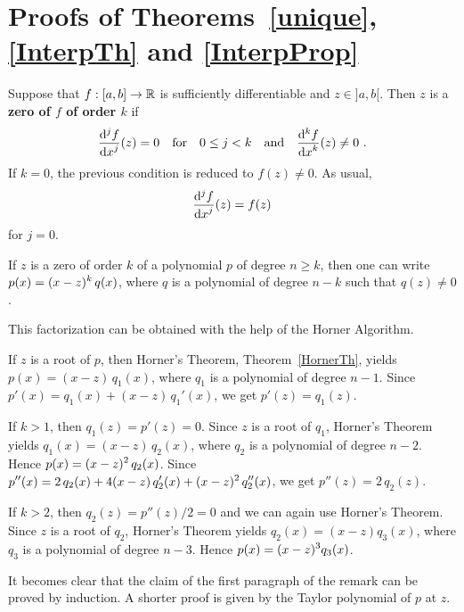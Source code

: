 \section{Proofs of Theorems~\ref{unique}, \ref{InterpTh} and
\ref{InterpProp}} \label{approx_proofs}

\begin{defn}
Suppose that $f:[a,b]\rightarrow \mathbb{R}$ is sufficiently differentiable
and $z\in ]a,b[$.  Then $z$ is a
{\bfseries zero of $f$ of order $k$} if
\[
\displaystyle \frac{\mathrm{d}^{j}{f}} {\displaystyle \mathrm{d}{x}^{j}}(z) = 0 \quad \text{for} \quad 0\leq j < k \quad
\text{and} \quad \displaystyle \frac{\mathrm{d}^{k}{f}} {\displaystyle \mathrm{d}{x}^{k}}(z) \neq 0 \ .
\]
If $k=0$, the previous condition is reduced to $f(z)\neq 0$.  As
usual,
\[
\displaystyle \frac{\mathrm{d}^{j}{f}} {\displaystyle \mathrm{d}{x}^{j}}(z) = f(z)
\]
for $j=0$.
\end{defn}

\begin{lemma} \label{FactPolyRoot}
If $z$ is a zero of order $k$ of a polynomial $p$ of degree
$n\geq k$, then one can write $\displaystyle p(x) = (x-z)^k\,q(x)$,
where $q$ is a polynomial of degree $n-k$ such that $q(z)\neq 0$.
\end{lemma}

This factorization can be obtained with the help of the Horner Algorithm.

If $z$ is a root of $p$, then Horner's Theorem,
Theorem~\ref{HornerTh}, yields $p(x) = (x-z)\,q_1(x)$, where $q_1$ is
a polynomial of degree $n-1$. Since $p'(x) = q_1(x) + (x-z)\,q_1'(x)$,
we get $p'(z) = q_1(z)$.

If $k>1$, then $q_1(z) = p'(z) =0$.  Since $z$ is a root of
$q_1$, Horner's Theorem yields $q_1(x) = (x-z)\,q_2(x)$, where $q_2$ is
a polynomial of degree $n-2$.  Hence
$\displaystyle p(x) = (x-z)^2\,q_2(x)$.  Since
$\displaystyle p''(x) = 2\,q_2(x) + 4(x-z)\,q_2'(x) + (x-z)^2\, q_2''(x)$,
we get $p''(z) = 2 \,q_2(z)$.

If $k>2$, then $q_2(z) = p''(z)/2 = 0$ and we can again use Horner's
Theorem.  Since $z$ is a root of $q_2$, Horner's Theorem yields
$q_2(x) = (x-z)q_3(x)$, where $q_3$ is a polynomial of degree $n-3$.
Hence $\displaystyle p(x) = (x-z)^3q_3(x)$.

It becomes clear that the claim of the first paragraph of the remark
can be proved by induction.  A shorter proof is given by the Taylor
polynomial of $p$ at $z$.

